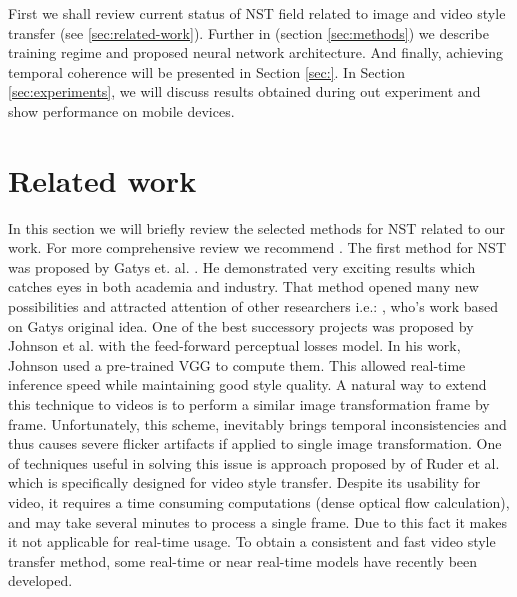 \documentclass[a4paper,conference]{IEEEtran}
\begin{document}
First we shall review current status of NST field related to image and video style transfer (see \ref{sec:related-work}). Further in (section \ref{sec:methods}) we describe training regime and proposed neural network architecture.  And finally, achieving temporal coherence will be presented in Section \ref{sec:}. In Section \ref{sec:experiments}, we will discuss results obtained during out experiment and show performance on mobile devices.


  
\section{Related work}
\label{related-work}

In this section we will briefly review the selected methods for NST related to our work. For more comprehensive review we recommend \cite{NeuralStyleTransferReview}.  
The first method for NST was proposed by Gatys et. al. \cite{Gatys2016ImageST}. He demonstrated very exciting results which catches eyes in both academia and industry. That method opened many new possibilities and attracted attention of other researchers i.e.: \cite{JohnsonAL16,DumoulinSK16,Champandard16,LuanPSB17,GatysEBHS16}, who's work based on Gatys original idea. One of the best successory projects was proposed by Johnson et al. \cite{JohnsonAL16} with the feed-forward perceptual losses model. In his work, Johnson  used a pre-trained VGG \cite{Simonyan15} to compute 
them. This allowed real-time inference speed while maintaining good style quality.  A natural way to extend this technique to videos is to perform a similar image transformation frame by frame. Unfortunately, this scheme, inevitably brings temporal inconsistencies and thus causes severe flicker artifacts if applied to single image transformation. One of techniques useful in solving this issue is approach proposed by of Ruder et al. \cite{RuderDB16} which is specifically designed for video style transfer. Despite its usability for video, it requires a time consuming computations (dense optical flow calculation), and may take several minutes to process a single frame. Due to this fact it makes it not applicable for real-time usage. To obtain a consistent and fast video style transfer method, some real-time or near real-time models have recently been developed. 
\end{document}

